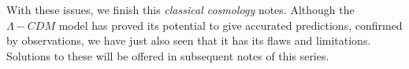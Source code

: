 \documentclass[11pt, a4paper]{article} %
\begin{document}
With these issues, we finish this \textit{classical cosmology} notes. Although the $\Lambda- CDM$ model has proved its potential to give accurated predictions, confirmed by observations, we have just also seen that it has its flaws and limitations. Solutions to these will be offered in subsequent notes of this series.








\end{document}

